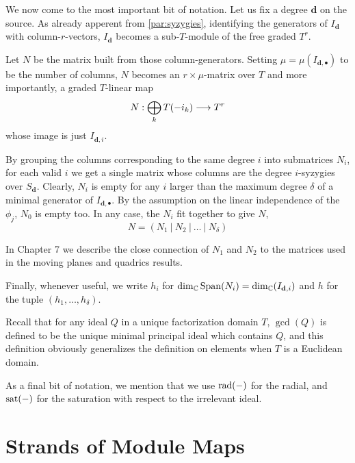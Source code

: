 \documentclass[fleqn,reqno]{amsart}
\begin{document}
\begin{paragraf}
\label{par:N-matrix}
We now come to the most important bit of notation.
Let us fix a degree $\mathbf d$ on the source.
As already apperent from \eqref{par:syzygies},
identifying the generators of $I_{\mathbf d}$ with column-$r$-vectors,
$I_{\mathbf d}$ becomes a sub-$T$-module of the free graded $T^r$.

Let $N$ be the matrix built from those column-generators.
Setting $\mu=\mu(I_{\mathbf d,\bullet})$ to be the number of columns,
$N$ becomes an $r\times\mu$-matrix over $T$
and more importantly, a graded $T$-linear map
\[
N:\bigoplus_{k} T(-i_k)\longrightarrow T^r
\]
whose image is just $I_{\mathbf d,i}$.

By grouping the columns corresponding to the same degree $i$ into submatrices $N_i$,
for each valid $i$ we get a single matrix whose columns are the degree $i$-syzygies over $S_{\mathbf d}$.
Clearly, $N_i$ is empty for any $i$ larger than the maximum degree $\delta$ of a minimal generator
of $I_{\mathbf d,\bullet}$.
By the assumption on the linear independence of the $\phi_j$, $N_0$ is empty too.
In any case, the $N_i$ fit together to give $N$,
\[
	N=(N_1~|~N_2~|~\ldots~|~N_\delta)
\]

In Chapter 7 we describe the close connection of $N_1$ and $N_2$ to the matrices used in
the moving planes and quadrics results.

Finally, whenever useful, we write $h_i$ for $\dim_{\mathbb{C}} \operatorname{Span} (N_i)=\dim_{\mathbb{C}}(I_{\mathbf d,i})$
and $h$ for the tuple $(h_1,\ldots,h_\delta)$.
\end{paragraf}

\begin{paragraf}
Recall that for any ideal $Q$ in a unique factorization domain $T$,
$\gcd(Q)$ is defined to be the unique minimal principal ideal which contains $Q$,
and this definition obviously generalizes the definition on elements
when $T$ is a Euclidean domain.
\end{paragraf}

\begin{paragraf}
As a final bit of notation, we mention that we use $\operatorname{rad}(-)$ for the radial,
and $\operatorname{sat}(-)$ for the saturation with respect to the irrelevant ideal.
\end{paragraf}



\section{Strands of Module Maps}
\label{sec:strands}
\end{document}

